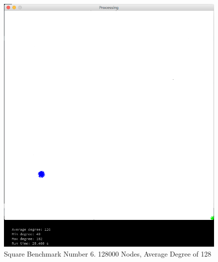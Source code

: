 \documentclass{article}
\begin{document}
\begin{center}
    \begin{figure}
        \includegraphics[scale=0.45]{./images/square_6.png}
        \caption{Square Benchmark Number 6. 128000 Nodes, Average Degree of 128}
        \label{square6}
    \end{figure}
\end{center}
\end{document}
